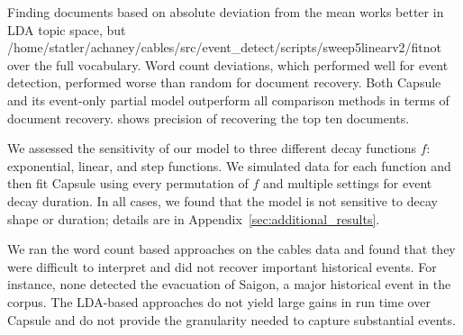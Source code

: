 Finding documents based on absolute deviation from the mean works better in LDA topic space, but /home/statler/achaney/cables/src/event_detect/scripts/sweep5linearv2/fitnot over the full vocabulary.  Word count deviations, which performed well for event detection, performed worse than random for document recovery.  Both Capsule and its event-only partial model outperform all comparison methods in terms of document recovery.   shows precision of recovering the top ten documents.

We assessed the sensitivity of our model to three different decay functions $f$: exponential, linear, and step functions.  We simulated data for each function and then fit Capsule using every permutation of $f$ and multiple settings for event decay duration.  In all cases, we found that the model is not sensitive to decay shape or duration; details are in Appendix~\ref{sec:additional_results}.

We ran the word count based approaches on the cables data and found that they were difficult to interpret and did not recover important historical events.  For instance, none detected the evacuation of Saigon, a major historical event in the corpus.  The LDA-based approaches do not yield large gains in run time over Capsule and do not provide the granularity needed to capture substantial events.